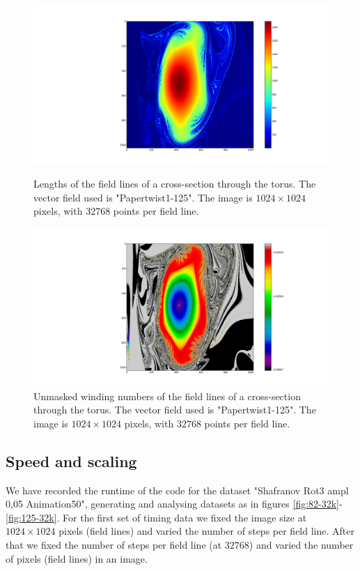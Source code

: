 \documentclass{article}
\begin{document}
\begin{figure}[!htb]
  \includegraphics[width=\linewidth]{Figures/Rings_Papertwist_twist1_125_lengths_steps32k.png}
  \caption{Lengths of the field lines of a cross-section through the torus. The vector field used is "Papertwist1-125". The image is $1024\times 1024$ pixels, with $32768$ points per field line.}\label{fig:125-lengths}
\endminipage\hfill
{}
  \includegraphics[width=\linewidth]{Figures/Rings_Papertwist_twist1_125_nomask_steps32k.png}
  \caption{Unmasked winding numbers of the field lines of a cross-section through the torus. The vector field used is "Papertwist1-125". The image is $1024\times 1024$ pixels, with $32768$ points per field line.}\label{fig:125-unmasked}
\endminipage
\end{figure}



\subsection{Speed and scaling}
We have recorded the runtime of the code for the dataset "Shafranov Rot3 ampl 0,05 Animation50", generating and analysing datasets as in figures \ref{fig:82-32k}-\ref{fig:125-32k}. For the first set of timing data we fixed the image size at $1024\times 1024$ pixels (field lines) and varied the number of steps per field line. After that we fixed the number of steps per field line (at $32768$) and varied the number of pixels (field lines) in an image.\\
\end{document}
